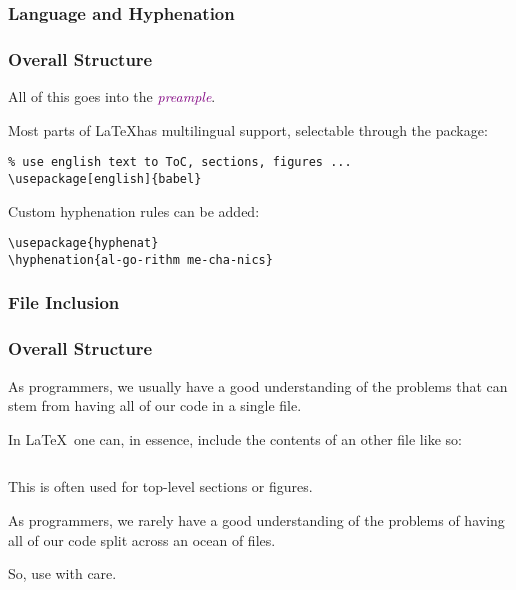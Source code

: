 \subsubsection{Language and Hyphenation}
\begin{frame}[fragile]
  \frametitle{Overall Structure }
  \vspace{3mm}
  All of this goes into the \textcolor{purple}{\textsl{preample}}.
  
  \pause
  \vspace{5mm}
  Most parts of \LaTeX has multilingual support, selectable through the  package:
  \begin{verbatim}
% use english text to ToC, sections, figures ...
\usepackage[english]{babel}
  \end{verbatim}
  
  \pause
  \vspace{5mm}
  Custom hyphenation rules can be added:
  \begin{verbatim}
\usepackage{hyphenat}
\hyphenation{al-go-rithm me-cha-nics}
  \end{verbatim}
\end{frame}

\subsubsection{File Inclusion}
\begin{frame}[fragile]
  \frametitle{Overall Structure }
  \vspace{3mm}
  As programmers, we usually have a good understanding of the problems that can stem from having all of our code in a single file.
  
  \vspace{5mm}
  In \LaTeX\ one can, in essence, include the contents of an other file like so:
  \begin{verbatim}

  \end{verbatim}
  
  \vspace{5mm}
  This is often used for top-level sections or figures.
  
  \pause
  \vspace{5mm}
  As programmers, we rarely have a good understanding of the problems of having all of our code split across an ocean of files.
  
  \pause
  \vspace{5mm}
  So, use with care.
\end{frame}

